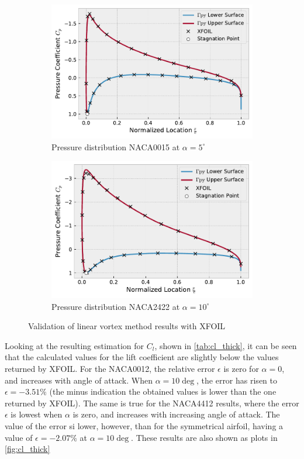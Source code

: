 \begin{figure}[h]
    \centering
    \begin{subfigure}{.5\textwidth}
      \centering
      \includegraphics[width=.9\linewidth]{static/thick_verif_naca0015_alpha5.pdf}
      \caption{Pressure distribution NACA0015 at $\alpha = 5^{\circ}$}
      \label{fig:thick_verif1}
    \end{subfigure}%
    \begin{subfigure}{.5\textwidth}
      \centering
      \includegraphics[width=.9\linewidth]{static/thick_verif_naca2422_alpha10.pdf}
      \caption{Pressure distribution NACA2422 at $\alpha = 10^{\circ}$}
      \label{fig:thick_verif2}
    \end{subfigure}
    \caption{\centering Validation of linear vortex method results with XFOIL\cite{xfoil}}
    \label{fig:thick_verif}
\end{figure}


Looking at the resulting estimation for $C_l$, shown in \autoref{tab:cl_thick},
it can be seen that the calculated values for the lift coefficient are slightly
below the values returned by XFOIL. For the NACA0012, the relative error
$\epsilon$ is zero for $\alpha=0$, and increases with angle of attack. When
$\alpha=10\deg$, the error has risen to $\epsilon=-3.51\%$ (the minus indication
the obtained values is lower than the one returned by XFOIL). The same is true
for the NACA4412 results, where the error $\epsilon$ is lowest when $\alpha$ is
zero, and increases with increasing angle of attack. The value of the error si
lower, however, than for the symmetrical airfoil, having a value of
$\epsilon=-2.07\%$ at $\alpha=10\deg$. These results are also shown as plots in \autoref{fig:cl_thick}

